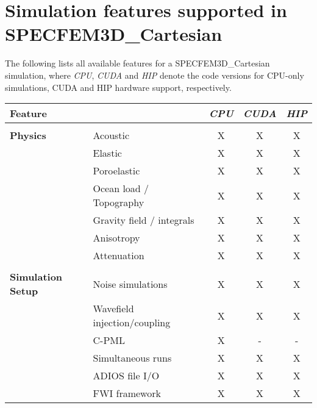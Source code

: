 \chapter*{Simulation features supported in SPECFEM3D\_Cartesian}

The following lists all available features for a SPECFEM3D\_Cartesian simulation,
where {\it CPU}, {\it CUDA} and {\it HIP} denote the code versions for CPU-only simulations,
CUDA and HIP hardware support, respectively.
%
\begin{table}[htp]
\vspace{-1cm}
\label{table:features}
\begin{center}
\begin{tabular}{ l l c c c}
\hline
{\bf Feature}   &   & {\it CPU} & {\it CUDA} & {\it HIP} \\
\hline
& & & & \\
{\bf Physics}   & Acoustic                  & X  & X  & X \\
                & Elastic                   & X  & X  & X \\
                & Poroelastic               & X  & X  & X \\
                & Ocean load / Topography   & X  & X  & X \\
                & Gravity field / integrals & X  & X  & X \\
                & Anisotropy                & X  & X  & X \\
                & Attenuation               & X  & X  & X \\
\hline
& & & & \\
{\bf Simulation Setup}  & Noise simulations                 & X  & X  & X \\
                        & Wavefield injection/coupling      & X  & X  & X \\
                        & C-PML                             & X  & -  & - \\
                        & Simultaneous runs                 & X  & X  & X \\
                        & ADIOS file I/O                    & X  & X  & X \\
                        & FWI framework                     & X  & X  & X \\


\end{tabular}
\end{center}
\end{table}
